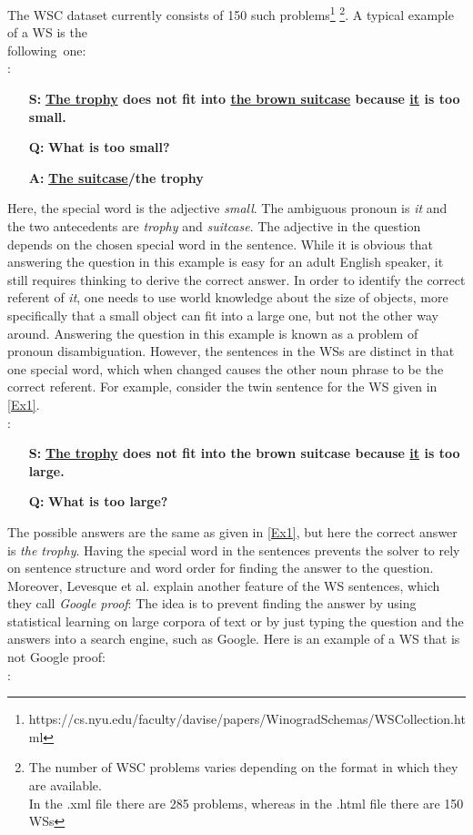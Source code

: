 The WSC dataset currently consists of 150 such problems\footnote{https://cs.nyu.edu/faculty/davise/papers/WinogradSchemas/WSCollection.html} \footnote{The number of WSC problems varies depending on the format in which they are available.\\In the .xml file there are 285 problems, whereas in the .html file there are 150 WSs}. A typical example of a WS is the \\following~one:\\
:
\begin{itemize}
	\item[\textbf{S:}] \textbf{\underline{The trophy} does not fit into \underline{the brown suitcase} because \underline{it} is too small.}
	\item[\textbf{Q:}] \textbf{What is too small?}
	\item[\textbf{A:}] \textbf{\underline{The suitcase}/the trophy}
\end{itemize}

Here, the special word is the adjective \textit{small}. The ambiguous pronoun is \textit{it} and the two antecedents are \textit{trophy} and \textit{suitcase}. The adjective in the question depends on the chosen special word in the sentence. While it is obvious that answering the question in this example is easy for an adult English speaker, it still requires thinking to derive the correct answer. In order to identify the correct referent of \textit{it}, one needs to use world knowledge about the size of objects, more specifically that a small object can fit into a large one, but not the other way around. Answering the question in this example is known as a problem of pronoun disambiguation. However, the sentences in the WSs are distinct in that one special word, which when changed causes the other noun phrase to be the correct referent. For example, consider the twin sentence for the WS given in \ref{Ex1}.\\
:
\begin{itemize}
	\item[\textbf{S:}] \textbf{\underline{The trophy} does not fit into the brown suitcase because \underline{it} is too large.}
	\item[\textbf{Q:}] \textbf{What is too large?}
\end{itemize}

The possible answers are the same as given in \ref{Ex1}, but here the correct answer is \textit{the trophy}. Having the special word in the sentences prevents the solver to rely on sentence structure and word order for finding the answer to the question.
Moreover, Levesque et al. \cite{DBLP:conf/kr/LevesqueDM12} explain another feature of the WS sentences, which they call \textit{Google proof}: The idea is to prevent finding the answer by using statistical learning on large corpora of text or by just typing the question and the answers into a search engine, such as Google.
Here is an example of a WS that is not Google proof:\\
:

